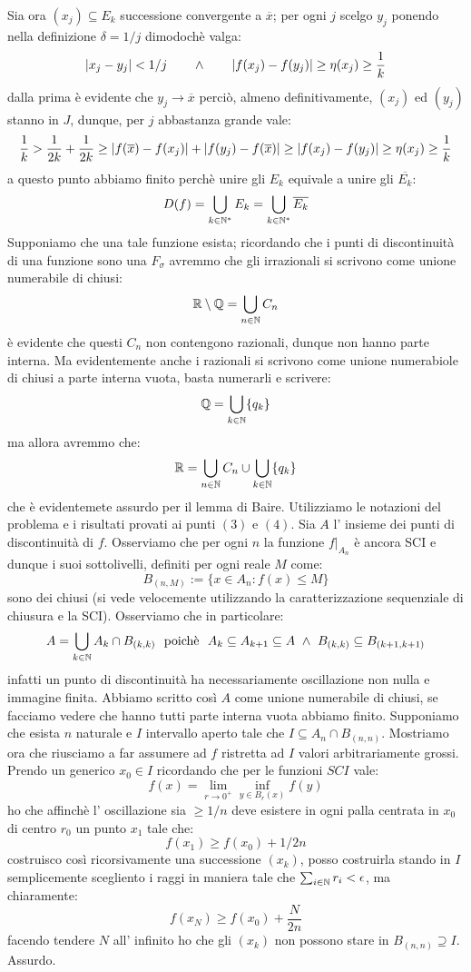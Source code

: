 Sia ora $(x_j)\subseteq E_k$ successione convergente a $\overline{x}$; per ogni $j$ scelgo $y_j$ ponendo nella definizione $\delta=1/j$ dimodochè valga:
$$
\vert{x_j-y_j}\vert<1/j\qquad \wedge \qquad \vert{f(x_j)-f(y_j)}\vert\geq \eta(x_j)\geq \frac{1}{k}
$$
dalla prima è evidente che $y_j\rightarrow \overline{x}$ perciò, almeno definitivamente, $(x_j)$ ed $(y_j)$ stanno in $J$, dunque, per $j$ abbastanza grande vale:
$$
\frac{1}{k}>\frac{1}{2k}+\frac{1}{2k}\geq \vert{f(\overline{x})-f(x_j)}\vert+\vert{f(y_j)-f(\overline{x})}\vert\geq \vert{f(x_j)-f(y_j)}\vert\geq \eta(x_j)\geq \frac{1}{k}
$$
a questo punto abbiamo finito perchè unire gli $E_k$ equivale a unire gli $\overline{E_k}$:
$$
D(f)=\bigcup_{k\in\mathbb{N}^{*}} E_k=\bigcup_{k\in\mathbb{N}^{*}} \overline{E_k}
$$
 Supponiamo che una tale funzione esista;  ricordando che i punti di discontinuità di una funzione sono una $F_\sigma$ avremmo che gli irrazionali si scrivono come unione numerabile di chiusi:
$$
\mathbb{R} \setminus \mathbb{Q}=\bigcup_{n\in\mathbb{N}} C_n
$$
è evidente che questi $C_n$ non contengono razionali, dunque non hanno parte interna. Ma evidentemente anche i razionali si scrivono come unione numerabiole di chiusi a parte interna vuota, basta numerarli e scrivere:
$$
\mathbb{Q}=\bigcup_{k\in\mathbb{N}} \{q_k\}
$$
ma allora avremmo che:
$$\mathbb{R}=\bigcup_{n\in\mathbb{N}} C_n \cup \bigcup_{k\in\mathbb{N}} \{q_k\}$$
che è evidentemete assurdo per il lemma di Baire.
 Utilizziamo le notazioni del problema  e i risultati provati ai punti $(3)$ e $(4)$. Sia $A$ l' insieme dei punti di discontinuità di $f$. Osserviamo che per ogni $n$ la funzione $f\vert _{A_n}$ è ancora SCI e dunque i suoi sottolivelli, definiti per ogni reale $M$ come:
$$B_{(n,M)}:=\{x\in A_n: f(x)\leq M\}$$ 
sono dei chiusi (si vede velocemente utilizzando la caratterizzazione sequenziale di chiusura e la SCI). Osserviamo che in particolare: 
$$ A=\bigcup_{k\in \mathbb{N}} A_k\cap B_{(k,k)}\ \mbox{ poichè }\ A_k\subseteq A_{k+1}\subseteq A\ \wedge\ B_{(k,k)}\subseteq B_{(k+1,k+1)} $$
infatti un punto di discontinuità ha necessariamente oscillazione non nulla e immagine finita. Abbiamo scritto così $A$ come unione numerabile di chiusi, se facciamo vedere che hanno tutti parte interna vuota abbiamo finito. Supponiamo che esista $n$ naturale e $I$ intervallo aperto tale che $I\subseteq A_n\cap B_{(n,n)}$. Mostriamo ora che riusciamo a far assumere ad $f$ ristretta ad $I$ valori arbitrariamente grossi. Prendo un generico $x_0\in I$ ricordando che per le funzioni $SCI$ vale:
$$ f(x)=\lim_{r\rightarrow 0^+} \inf_{y\in B_{r}(x)} f(y) $$ 
ho che affinchè l' oscillazione sia $\geq 1/n$ deve esistere in ogni palla centrata in $x_0$ di centro $r_0$ un punto $x_1$ tale che:
$$ f(x_1)\geq f(x_0)+1/2n $$
costruisco così ricorsivamente una successione $(x_k)$, posso costruirla stando in $I$ semplicemente scegliento i raggi in maniera tale che $\sum_{i\in \mathbb{N}} r_i<\epsilon$, ma chiaramente:
$$ f(x_N)\geq f(x_0)+\frac{N}{2n} $$
facendo tendere $N$ all' infinito ho che gli $(x_k)$ non possono stare in $B_{(n,n)}\supseteq I$. Assurdo.

